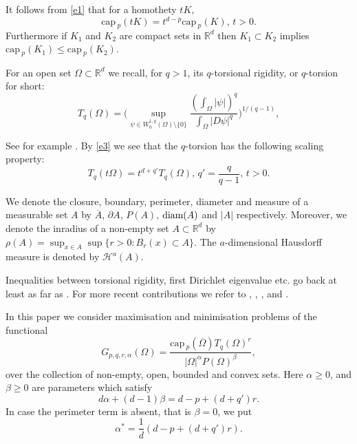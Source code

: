 \documentclass[a4paper,9pt]{article}
\newcommand{\R}{\mathbb{R}}
\def\cp{\mathrm{cap}\,}
\newcommand{\Om}{\Omega}
\begin{document}
It follows from \eqref{e1} that for a homothety $tK,$
\begin{equation}\label{e2}
\cp_p(tK)=t^{d-p}\cp_p(K),\,t>0.
\end{equation}
Furthermore if $K_1$ and $K_2$ are compact sets in $\R^d$ then $K_1\subset K_2$ implies $\cp_p(K_1)\le \cp_p(K_2)$.

For an open set $\Omega\subset \R^d$ we recall, for $q>1$, its $q$-torsional rigidity, or $q$-torsion for short:
\begin{equation}\label{e3}
T_q(\Omega)=\Bigg(\sup_{\psi\in W_0^{1,q}(\Omega)\setminus\{0\}} \frac{\displaystyle\left(\int_\Omega|\psi| \right)^{q}}{\displaystyle\int_\Omega |D \psi|^q }\Bigg)^{1/(q-1)},
\end{equation}

See for example \cite{JDE}. By \eqref{e3} we see that the $q$-torsion has the following scaling property:
\begin{equation}\label{e4}
T_q(t\Omega)=t^{d+q'}T_q(\Omega), \, q'=\frac{q}{q-1},\,t>0.
\end{equation}

We denote the closure, boundary, perimeter, diameter and measure of a measurable set $A$ by $\overline{A}$, $\partial A$, $P(A)$, $\textup{diam}(A)$ and $|A|$ respectively. Moreover, we denote the inradius of a non-empty set $A\subset \R^d$ by $\rho(A)=\sup_{x\in A}\sup\{r>0:B_r(x)\subset A\}$. The $a$-dimensional Hausdorff measure is  denoted by $\mathcal{H}^a(A)$.

Inequalities between torsional rigidity, first Dirichlet eigenvalue etc. go back at least as far as \cite{PSZ}. For more recent contributions we refer to \cite{MaNa}, \cite{cri}, \cite{MBP}, \cite{BBP1} and \cite{BBP2}.


In this paper we consider maximisation and minimisation problems of the functional
\begin{equation}\label{e5}
G_{p,q,r,\alpha}(\Om)=\frac{\cp_p(\overline{\Om})T_q(\Om)^r}{|\Om|^{\alpha}P(\Om)^{\beta}},
\end{equation}
over the collection of non-empty, open, bounded and convex sets.
Here $\alpha\ge 0$, and $\beta\ge 0$ are parameters which satisfy
\begin{equation}\label{e6}
d\alpha+(d-1)\beta=d-p+(d+q')r.
\end{equation}
In case the perimeter  term is absent, that is $\beta=0$, we put
\begin{equation}\label{e7}
\alpha^*=\frac1d(d-p+(d+q')r).
\end{equation}
\end{document}
